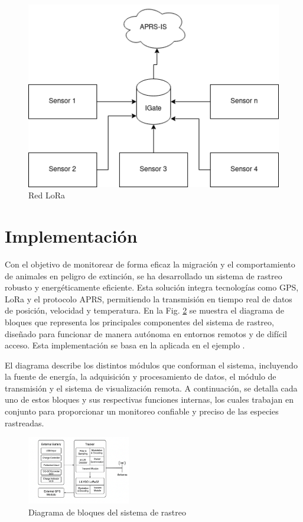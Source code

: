 \documentclass[conference]{IEEEtran}
\begin{document}
\begin{figure}[H]
	\centering
    \includegraphics[width=0.6\linewidth]{Imagenes/redLora.png}
    \caption{Red LoRa}
    \label{fig:lora_network}
\end{figure}

\section{\textbf{Implementación}}

\vspace{2mm}

Con el objetivo de monitorear de forma eficaz la migración y el comportamiento de animales en peligro de extinción, se ha desarrollado un sistema de rastreo robusto y energéticamente eficiente. Esta solución integra tecnologías como GPS, LoRa y el protocolo APRS, permitiendo la transmisión en tiempo real de datos de posición, velocidad y temperatura. En la Fig. \ref{fig:tracker} se muestra el diagrama de bloques que representa los principales componentes del sistema de rastreo, diseñado para funcionar de manera autónoma en entornos remotos y de difícil acceso. Esta implementación se basa en la aplicada en el ejemplo \cite{paper}.

\vspace{2mm}

El diagrama describe los distintos módulos que conforman el sistema, incluyendo la fuente de energía, la adquisición y procesamiento de datos, el módulo de transmisión y el sistema de visualización remota. A continuación, se detalla cada uno de estos bloques y sus respectivas funciones internas, los cuales trabajan en conjunto para proporcionar un monitoreo confiable y preciso de las especies rastreadas.

\vspace{2mm}

\begin{figure}[H]
    \centering
    \includegraphics[width=0.4\textwidth]{Imagenes/tracker.png}
    \caption{Diagrama de bloques del sistema de rastreo}
    \label{fig:tracker}
\end{figure}
\end{document}
